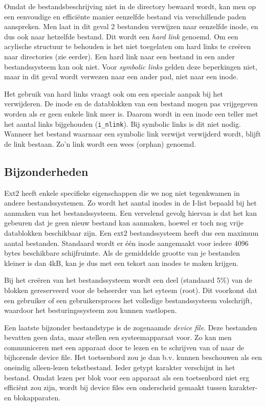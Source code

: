 Omdat de bestandsbeschrijving niet in de directory bewaard wordt, kan men op een eenvoudige en effici\"ente
manier eenzelfde bestand via verschillende paden aanspreken. Men laat in dit geval 2 bestanden verwijzen
naar eenzelfde inode, en dus ook naar hetzelfde bestand. Dit wordt een \emph{hard link} genoemd. Om een
acylische structuur te behouden is het niet toegelaten om hard links te cre\"eren naar directories
(zie eerder). Een hard link naar een bestand in een ander bestandssysteem kan ook niet. Voor
\emph{symbolic links} gelden deze beperkingen niet, maar in dit geval wordt verwezen naar een ander pad,
niet naar een inode.

Het gebruik van hard links vraagt ook om een speciale aanpak bij het verwijderen. De inode en de datablokken van
een bestand mogen pas vrijgegeven worden als er geen enkele link meer is. Daarom wordt in een inode een teller
met het aantal links bijgehouden (\verb|i_nlink|). Bij symbolic links is dit niet nodig. Wanneer het bestand
waarnaar een symbolic link verwijst verwijderd wordt, blijft de link bestaan. Zo'n link wordt een wees (orphan)
genoemd.

\subsection{Bijzonderheden}

Ext2 heeft enkele specifieke eigenschappen die we nog niet tegenkwamen in andere bestandssystemen. Zo wordt
het aantal inodes in de I-list bepaald bij het aanmaken van het bestandssysteem. Een vervelend
gevolg hiervan is dat het kan gebeuren dat je geen nieuw bestand kan aanmaken, hoewel er toch nog vrije
datablokken beschikbaar zijn. Een ext2 bestandssysteem heeft dus een maximum aantal bestanden. Standaard
wordt er \'e\'en inode aangemaakt voor iedere 4096 bytes beschikbare schijfruimte. Als de gemiddelde grootte
van je bestanden kleiner is dan 4kB, kan je dus met een tekort aan inodes te maken krijgen.

Bij het cre\"eren van het bestandssysteem wordt een deel (standaard 5\%) van de blokken gereserveerd voor
de beheerder van het syteem (root). Dit voorkomt dat een gebruiker of een gebruikersproces het volledige
bestandssysteem volschrijft, waardoor het besturingssysteem zou kunnen vastlopen.

Een laatste bijzonder bestandstype is de zogenaamde \emph{device file}. Deze bestanden bevatten geen data, maar
stellen een systeemapparaat voor. Zo kan men communiceren met een apparaat door te lezen en te schrijven van of
naar de bijhorende device file. Het toetsenbord zou je dan b.v. kunnen beschouwen als een oneindig alleen-lezen
tekstbestand. Ieder getypt karakter verschijnt in het bestand. Omdat lezen per blok voor een apparaat als een
toetsenbord niet erg effici\"ent zou zijn, wordt bij device files een onderscheid gemaakt tussen karakter- en
blokapparaten.
